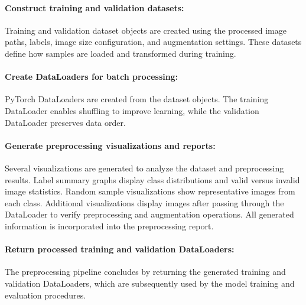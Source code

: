 \vspace{1cm}
\paragraph{Construct training and validation datasets:}\par
Training and validation dataset objects are created using the processed image paths, labels, image size configuration, and augmentation settings. These datasets define how samples are loaded and transformed during training.

\vspace{1cm}
\paragraph{Create DataLoaders for batch processing:}\par
PyTorch DataLoaders are created from the dataset objects. The training DataLoader enables shuffling to improve learning, while the validation DataLoader preserves data order. 

\vspace{1cm}
\paragraph{Generate preprocessing visualizations and reports:}\par
Several visualizations are generated to analyze the dataset and preprocessing results. Label summary graphs display class distributions and valid versus invalid image statistics. Random sample visualizations show representative images from each class. Additional visualizations display images after passing through the DataLoader to verify preprocessing and augmentation operations. All generated information is incorporated into the preprocessing report.

\vspace{1cm}
\paragraph{Return processed training and validation DataLoaders:}\par
The preprocessing pipeline concludes by returning the generated training and validation DataLoaders, which are subsequently used by the model training and evaluation procedures.
\vspace{1cm}
